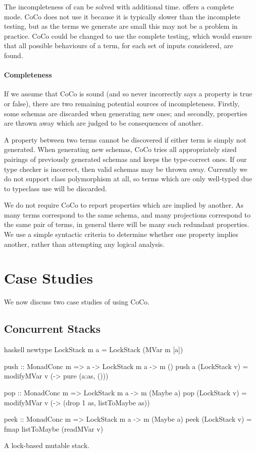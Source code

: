 The incompleteness of \dejafu{} can be solved with additional time.
\dejafu{} offers a complete mode.  CoCo does not use it because it is
typically slower than the incomplete testing, but as the terms we
generate are small this may not be a problem in practice.  CoCo could
be changed to use the complete testing, which would ensure that all
possible behaviours of a term, for each set of inputs considered, are
found.

\paragraph{Completeness}
If we assume that CoCo is sound (and so never incorrectly says a
property is true or false), there are two remaining potential sources
of incompleteness.  Firstly, some schemas are discarded when
generating new ones; and secondly, properties are thrown away which
are judged to be consequences of another.

A property between two terms cannot be discovered if either term is
simply not generated.  When generating new schemas, CoCo tries all
appropriately sized pairings of previously generated schemas and keeps
the type-correct ones.  If our type checker is incorrect, then valid
schemas may be thrown away.  Currently we do not support class
polymorphism at all, so terms which are only well-typed due to
typeclass use will be discarded.

We do not require CoCo to report properties which are implied by
another.  As many terms correspond to the same schema, and many
projections correspond to the same pair of terms, in general there
will be many such redundant properties.  We use a simple syntactic
criteria to determine whether one property implies another, rather
than attempting any logical analysis.

\section{Case Studies}
\label{sec:coco-cases}

We now discuss two case studies of using CoCo.

\subsection{Concurrent Stacks}
\label{sec:coco-cases-stack}

\begin{listing}
\centering
\begin{cminted}{haskell}
newtype LockStack m a = LockStack (MVar m [a])

push :: MonadConc m => a -> LockStack m a -> m ()
push a (LockStack v) = modifyMVar v (\as -> pure (a:as, ()))

pop :: MonadConc m => LockStack m a -> m (Maybe a)
pop (LockStack v) = modifyMVar v (\as -> (drop 1 as, listToMaybe as))

peek :: MonadConc m => LockStack m a -> m (Maybe a)
peek (LockStack v) = fmap listToMaybe (readMVar v)
\end{cminted}
\caption{A lock-based mutable stack.}\label{lst:lockstack}
\end{listing}

